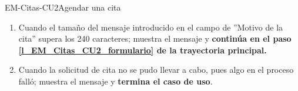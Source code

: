 \begin{UseCase}{EM-Citas-CU2}{Agendar una cita}
{\begin{enumerate}
			\item \label{EM-Cita-CU2-E4} Cuando el tamaño del mensaje introducido en el campo de ''Motivo de la cita'' supera los 240 caracteres; muestra el mensaje  y \textbf{continúa en el paso \ref{l_EM_Citas_CU2_formulario} de la trayectoria principal.}

			\item \label{EM-Cita-CU2-E5} Cuando la solicitud de cita no se pudo llevar a cabo, pues algo en el proceso falló; muestra el mensaje  y \textbf{termina el caso de uso}.
		\end{enumerate}
	}
\end{UseCase}


